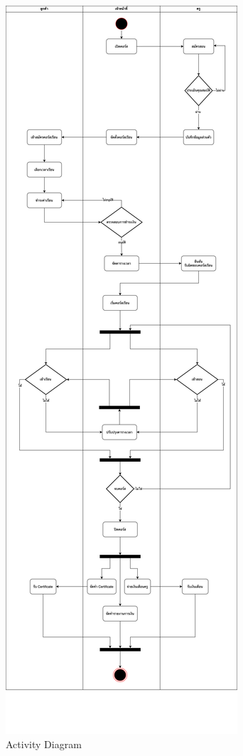 \begin{figure}
\includegraphics[width=\textwidth]{./images/section-03/aqkids-activities-latest.drawio.png}
\caption{Activity Diagram} \label{fig:aqkids-activities}
\end{figure}

